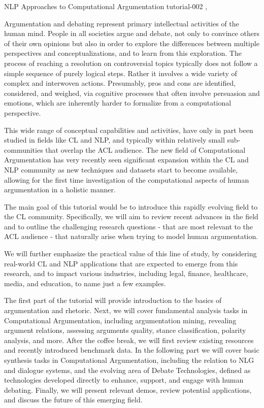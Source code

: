 \begin{tutorial}
  {NLP Approaches to Computational Argumentation}
  {tutorial-002}
  {\daydateyear, \tutorialmorningtime}
  {\TutLocB}

Argumentation and debating represent primary intellectual activities of the human mind. People in all societies argue and debate, not only to convince others of their own opinions but also in order to explore the differences between multiple perspectives and conceptualizations, and to learn from this exploration. The process of reaching a resolution on controversial topics typically does not follow a simple sequence of purely logical steps. Rather it involves a wide variety of complex and interwoven actions. Presumably, pros and cons are identified, considered, and weighed, via cognitive processes that often involve persuasion and emotions, which are inherently harder to formalize from a computational perspective.

This wide range of conceptual capabilities and activities, have only in part been studied in fields like CL and NLP, and typically within relatively small sub-communities that overlap the ACL audience. The new field of Computational Argumentation has very recently seen significant expansion within the CL and NLP community as new techniques and datasets start to become available, allowing for the first time investigation of the computational aspects of human argumentation in a holistic manner. 

The main goal of this tutorial would be to introduce this rapidly evolving field to the CL community. Specifically, we will aim to review recent advances in the field and to outline the challenging research questions - that are most relevant to the ACL audience - that naturally arise when trying to model human argumentation.

We will further emphasize the practical value of this line of study, by considering real-world CL and NLP applications that are expected to emerge from this research, and to impact various industries, including legal, finance, healthcare, media, and education, to name just a few examples.

The first part of the tutorial will provide introduction to the basics of argumentation and rhetoric. Next, we will cover fundamental analysis tasks in Computational Argumentation, including argumentation mining, revealing argument relations, assessing arguments quality, stance classification, polarity analysis, and more. After the coffee break, we will first review existing resources and recently introduced benchmark data. In the following part we will cover basic synthesis tasks in Computational Argumentation, including the relation to NLG and dialogue systems, and the evolving area of Debate Technologies, defined as technologies developed directly to enhance, support, and engage with human debating. Finally, we will present relevant demos, review potential applications, and discuss the future of this emerging field.

\end{tutorial}
